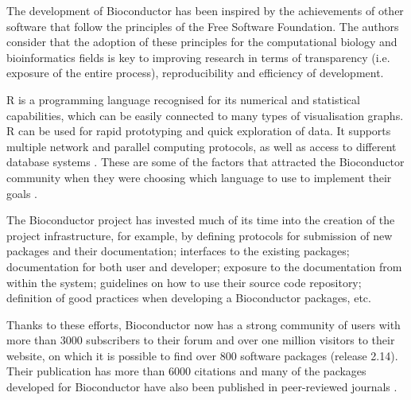 The development of Bioconductor has been inspired by the achievements of other software that follow the principles of the Free Software Foundation. The authors consider that the adoption of these principles for the computational biology and bioinformatics fields is key to improving research in terms of transparency (i.e. exposure of the entire process), reproducibility and efficiency of development.

R is a programming language recognised for its numerical and statistical capabilities, which can be easily connected to many types of visualisation graphs. R can be used for rapid prototyping and quick exploration of data. It supports multiple network and parallel computing protocols, as well as access to different database systems \cite{IHA1996}. These are some of the factors that attracted the Bioconductor community when they were choosing which language to use to implement their goals \cite{GEN2004}.

The Bioconductor project has invested much of its time into the creation of the project infrastructure, for example, by defining protocols for submission of new packages and their documentation; interfaces to the existing packages; documentation for both user and developer; exposure to the documentation from within the system; guidelines on how to use their source code repository; definition of good practices when developing a Bioconductor packages, etc.

Thanks to these efforts, Bioconductor now has a strong community of users with more than 3000 subscribers to their forum and over one million visitors to their website, on which it is possible to find over 800 software packages (release 2.14). Their publication \cite{GEN2004} has more than 6000 citations and many of the packages developed for Bioconductor have also been published in peer-reviewed journals \cite{BIO2014}.


